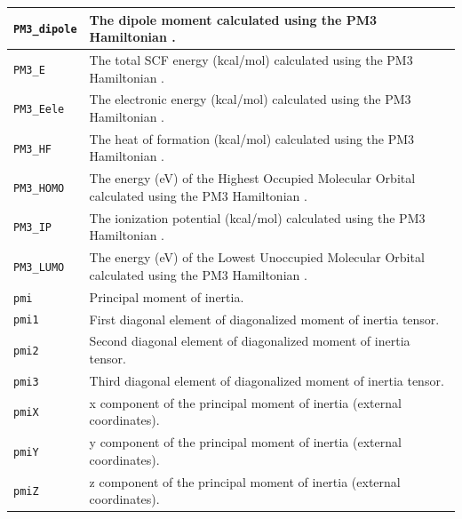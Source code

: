 \documentclass[12pt,a4paper]{article}
\begin{document}
\begin{longtable}{@{\zz}|p{}|p{}|}
\texttt{PM3\_dipole} & The dipole moment calculated using the PM3 Hamiltonian 
\cite{MOPAC1993}.\\ \hline

\texttt{PM3\_E} & The total SCF energy (kcal/mol) calculated using the PM3 
Hamiltonian \cite{MOPAC1993}.\\ \hline

\texttt{PM3\_Eele} & The electronic energy (kcal/mol) calculated using the PM3 
Hamiltonian \cite{MOPAC1993}.\\ \hline

\texttt{PM3\_HF} & The heat of formation (kcal/mol) calculated using the PM3 
Hamiltonian \cite{MOPAC1993}.\\ \hline

\texttt{PM3\_HOMO} & The energy (eV) of the Highest Occupied Molecular 
Orbital calculated using the PM3 Hamiltonian \cite{MOPAC1993}.\\ \hline

\texttt{PM3\_IP} & The ionization potential (kcal/mol) calculated using 
the PM3 Hamiltonian \cite{MOPAC1993}.\\ \hline

\texttt{PM3\_LUMO} & The energy (eV) of the Lowest Unoccupied Molecular 
Orbital calculated using the PM3 Hamiltonian \cite{MOPAC1993}.\\ \hline

\texttt{pmi} & Principal moment of inertia.\\ \hline

\texttt{pmi1} & First diagonal element of diagonalized moment of inertia 
tensor.\\ \hline

\texttt{pmi2} & Second diagonal element of diagonalized moment of inertia 
tensor.\\ \hline

\texttt{pmi3} & Third diagonal element of diagonalized moment of inertia 
tensor.\\ \hline

\texttt{pmiX} & x component of the principal moment of inertia 
(external coordinates).\\ \hline

\texttt{pmiY} & y component of the principal moment of inertia 
(external coordinates).\\ \hline

\texttt{pmiZ} & z component of the principal moment of inertia 
(external coordinates).\\ \hline


\end{longtable}
\end{document}
